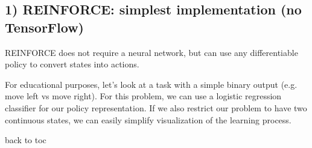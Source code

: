 \documentclass[11pt]{article}
\begin{document}
    \subsection{ 1) REINFORCE: simplest implementation (no
TensorFlow)}\label{reinforce-simplest-implementation-no-tensorflow}

REINFORCE does not require a neural network, but can use any
differentiable policy to convert states into actions.

For educational purposes, let's look at a task with a simple binary
output (e.g. move left vs move right). For this problem, we can use a
logistic regression classifier for our policy representation. If we also
restrict our problem to have two continuous states, we can easily
simplify visualization of the learning process.

back to toc
\end{document}
